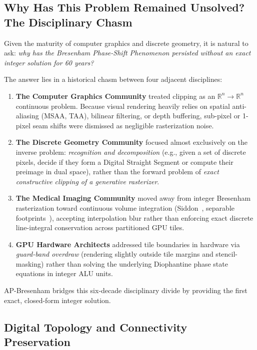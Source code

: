 \documentclass[12pt,a4paper]{article}
\theoremstyle{definition}
\newcommand{\R}{\mathbb{R}}
\begin{document}
\subsection{Why Has This Problem Remained Unsolved? The Disciplinary Chasm}
\label{sec:disciplinary_chasm}

Given the maturity of computer graphics and discrete geometry, it is
natural to ask: \emph{why has the Bresenham Phase-Shift Phenomenon
persisted without an exact integer solution for 60 years?}

The answer lies in a historical chasm between four adjacent
disciplines:
\begin{enumerate}
  \item \textbf{The Computer Graphics Community} treated clipping as an
    $\R^n \to \R^n$ continuous problem. Because visual rendering
    heavily relies on spatial anti-aliasing (MSAA, TAA), bilinear
    filtering, or depth buffering, sub-pixel or 1-pixel seam shifts
    were dismissed as negligible rasterization noise.
  \item \textbf{The Discrete Geometry Community} focused almost
    exclusively on the inverse problem: \emph{recognition and
    decomposition} (e.g., given a set of discrete pixels, decide if
    they form a Digital Straight Segment or compute their preimage in
    dual space), rather than the forward problem of \emph{exact
    constructive clipping of a generative rasterizer}.
  \item \textbf{The Medical Imaging Community} moved away from integer
    Bresenham rasterization toward continuous volume integration
    (Siddon~\cite{siddon1985fast}, separable footprints~\cite{long2010separable}),
    accepting interpolation blur rather than enforcing exact discrete
    line-integral conservation across partitioned GPU tiles.
  \item \textbf{GPU Hardware Architects} addressed tile boundaries in
    hardware via \emph{guard-band overdraw} (rendering slightly
    outside tile margins and stencil-masking) rather than solving the
    underlying Diophantine phase state equations in integer ALU units.
\end{enumerate}

AP-Bresenham bridges this six-decade disciplinary divide by providing
the first exact, closed-form integer solution.

\subsection{Digital Topology and Connectivity Preservation}
\end{document}
